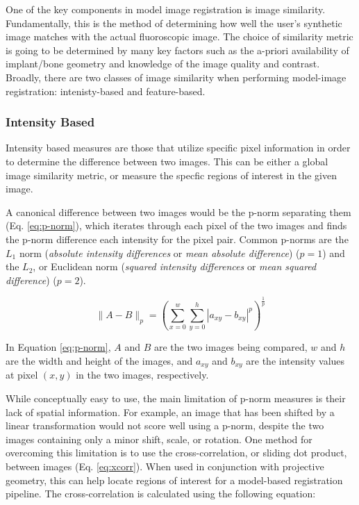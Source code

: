 One of the key components in model image registration is image similarity. Fundamentally, this is the method of determining how well the user's synthetic image matches with the actual fluoroscopic image. The choice of similarity metric is going to be determined by many key factors such as the a-priori availability of implant/bone geometry and knowledge of the image quality and contrast. Broadly, there are two classes of image similarity when performing model-image registration: intenisty-based and feature-based.

\subsubsection{Intensity Based}
\label{sec:img-sim-intensity}
Intensity based measures are those that utilize specific pixel information in order to determine the difference between two images. This can be either a global image similarity metric, or measure the specfic regions of interest in the given image. 

A canonical difference between two images would be the p-norm separating them (Eq. \ref{eq:p-norm}), which iterates through each pixel of the two images and finds the p-norm difference each intensity for the pixel pair. Common p-norms are the $L_1$ norm (\emph{absolute intensity differences} or \emph{mean absolute difference}) \cite{kanadeStereoMatchingAlgorithm1994} ($p=1$) and the $L_{2}$, or Euclidean norm (\emph{squared intensity differences} or \emph{mean squared difference}) \cite{hannahComputerMatchingAreas1977}($p=2$).

\begin{equation}
    \|A-B\|_{p} = (\sum_{x=0}^{w}\sum_{y=0}^{h}|a_{xy}-b_{xy}|^{p})^{\frac{1}{p}}
    \label{eq:p-norm}
\end{equation}

In Equation \cref{eq:p-norm}, $A$ and $B$ are the two images being compared, $w$ and $h$ are the width and height of the images, and $a_{xy}$ and $b_{xy}$ are the intensity values at pixel $(x,y)$ in the two images, respectively.

While conceptually easy to use, the main limitation of p-norm measures is their lack of spatial information. For example, an image that has been shifted by a linear transformation would not score well using a p-norm, despite the two images containing only a minor shift, scale, or rotation. One method for overcoming this limitation is to use the cross-correlation, or sliding dot product, between images \cite{bendatRandomDataAnalysis2010,hannahComputerMatchingAreas1977} (Eq. \ref{eq:xcorr}). When used in conjunction with projective geometry, this can help locate regions of interest for a model-based registration pipeline. The cross-correlation is calculated using the following equation:

